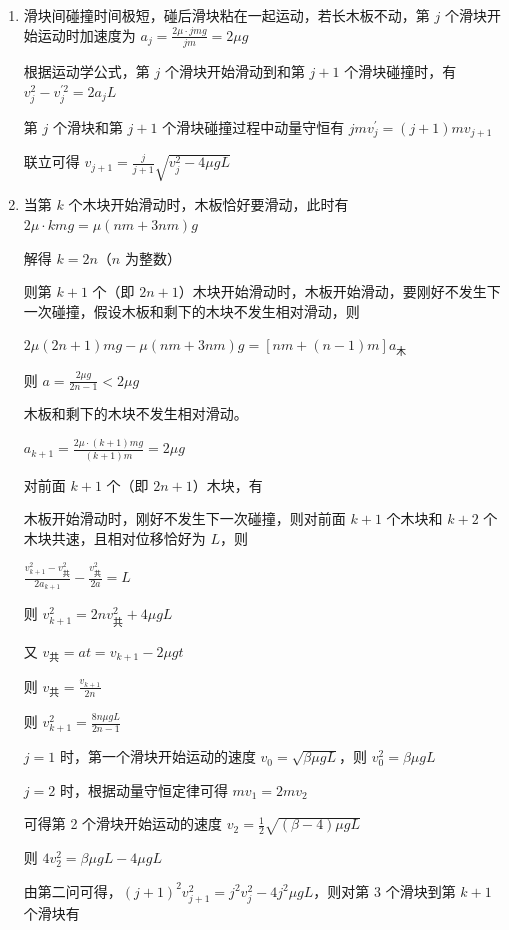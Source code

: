 \documentclass[\gkver]{gaokaozhenti}
\begin{document}
\begin{enumerate}
{\begin{enumerate}
	解得 $v_{1} = \sqrt{(\beta - 4)\mu gL}$

	\item
	滑块间碰撞时间极短，碰后滑块粘在一起运动，若长木板不动，第 $j$ 个滑块开始运动时加速度为 $a_{j}=\frac{2\mu\cdot jmg}{jm}=2\mu g$

	根据运动学公式，第 $j$ 个滑块开始滑动到和第 $j+1$ 个滑块碰撞时，有 $v_{j}^{2}-v_{j}^{\prime 2}=2a_{j}L$

	第 $j$ 个滑块和第 $j+1$ 个滑块碰撞过程中动量守恒有 $jmv_{j}^{\prime}=(j+1)mv_{j+1}$

	联立可得 $v_{j+1}=\frac{j}{j+1}\sqrt{v_{j}^{2}-4\mu gL}$

	\item
	当第 $k$ 个木块开始滑动时，木板恰好要滑动，此时有 $2\mu \cdot kmg = \mu(nm + 3nm)g$

	解得 $k = 2n$（$n$ 为整数）

	则第 $k+1$ 个（即 $2n+1$）木块开始滑动时，木板开始滑动，要刚好不发生下一次碰撞，假设木板和剩下的木块不发生相对滑动，则

	$2\mu(2n+1)mg - \mu(nm + 3nm)g = \left[nm + (n-1)m\right]a_\text{木}$

	则 $a=\frac{2\mu g}{2n-1}<2\mu g$

	木板和剩下的木块不发生相对滑动。

	$a_{k+1}=\frac{2\mu\cdot\left(k+1\right)mg}{\left(k+1\right)m}=2\mu g$

	对前面 $k+1$ 个（即 $2n+1$）木块，有

	木板开始滑动时，刚好不发生下一次碰撞，则对前面 $k+1$ 个木块和 $k+2$ 个木块共速，且相对位移恰好为 $L$，则

	$\frac{v_{k+1}^{2}-v_\text{共}^{2}}{2a_{k+1}}-\frac{v_\text{共}^{2}}{2a}=L$

	则 $v_{k+1}^{2} = 2nv_\text{共}^{2} + 4\mu gL$

	又 $v_\text{共} = at = v_{k+1} - 2\mu gt$

	则 $v_\text{共} = \frac{v_{k+1}}{2n}$

	则 $v_{k+1}^{2} = \frac{8n\mu gL}{2n-1}$

	$j = 1$ 时，第一个滑块开始运动的速度 $v_{0} = \sqrt{\beta\mu gL}$，则 $v_{0}^{2} = \beta\mu gL$

	$j = 2$ 时，根据动量守恒定律可得 $mv_{1} = 2mv_{2}$

	可得第 2 个滑块开始运动的速度 $v_{2} = \frac{1}{2}\sqrt{(\beta - 4)\mu gL}$

	则 $4v_{2}^{2} = \beta\mu gL - 4\mu gL$

	由第二问可得，$(j+1)^{2} v_{j+1}^{2} = j^{2} v_{j}^{2} - 4j^{2}\mu gL$，则对第 3 个滑块到第 $k+1$ 个滑块有


\end{enumerate}}
\end{enumerate}
\end{document}
